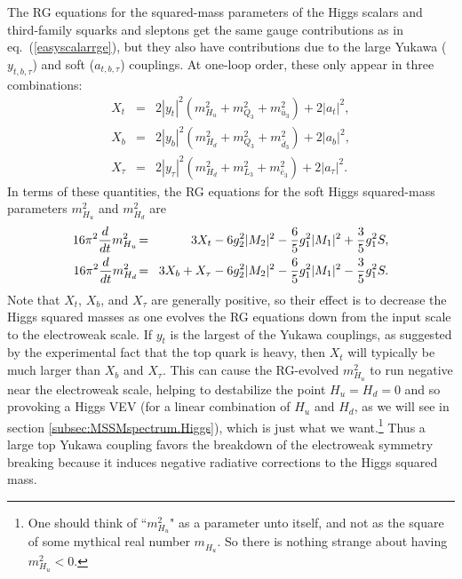 \documentclass[12pt]{article}
\def\beq{\begin{eqnarray}}
\def\eeq{\end{eqnarray}}
\def\sbar{\overline}
\begin{document}
The RG equations for the squared-mass parameters of the Higgs scalars and
third-family squarks and sleptons get the same gauge contributions as in
eq.~(\ref{easyscalarrge}), but they also have contributions due to the
large Yukawa ($y_{t,b,\tau}$) and soft ($a_{t,b,\tau}$) couplings. At
one-loop order, these only appear in three combinations: 
\beq
X_t \!&=&\!  2 |y_t|^2 (m_{H_u}^2 + m_{Q_3}^2 + m_{\sbar u_3}^2) +2 |a_t|^2,
\\
X_b \!&=& \! 2 |y_b|^2 (m_{H_d}^2 + m_{Q_3}^2 + m_{\sbar d_3}^2) +2 |a_b|^2,
\\
X_\tau\! &=&\!  2 |y_\tau|^2 (m_{H_d}^2 + m_{L_3}^2 + m_{\sbar e_3}^2)
+ 2 |a_\tau|^2.
\eeq
In terms of these quantities, the RG equations for the soft Higgs
squared-mass parameters $m_{H_u}^2$ and $m_{H_d}^2$ are
\beq
16 \pi^2 {d\over dt} m_{H_u}^2 \!&=&\!
3 X_t - 6 g_2^2 |M_2|^2 - {6\over 5} g_1^2 |M_1|^2 + \frac{3}{5} g^{2}_1 S
,
\label{mhurge}
\\
16\pi^2{d\over dt} m_{H_d}^2 \!&=&\!
3 X_b + X_\tau - 6 g_2^2 |M_2|^2 - {6\over 5} g_1^2 |M_1|^2 - \frac{3}{5} 
g^{2}_1 S
.
\label{mhdrge}
\eeq
Note that $X_t$, $X_b$, and $X_\tau$ are generally positive, so their
effect is to decrease the Higgs squared masses as one evolves the RG equations
down from the input scale to the electroweak scale. If $y_t$ is the
largest of the Yukawa couplings, as suggested by the experimental fact
that the top quark is heavy, then $X_t$ will typically be much larger than
$X_b$ and $X_\tau$. This can cause the RG-evolved $m_{H_u}^2$ to run
negative near the electroweak scale, helping to destabilize the point $H_u
= H_d = 0$ and so provoking a Higgs VEV (for a linear combination of $H_u$
and $H_d$, as we will see in section \ref{subsec:MSSMspectrum.Higgs}),
which is just what we want.\footnote{One should think of ``$m_{H_u}^2$" as
a parameter unto itself, and not as the square of some mythical real
number $m^{\phantom{2}}_{H_u}$. So there is nothing strange about having
$m_{H_u}^2 < 0$.
} Thus a large top Yukawa coupling favors
the breakdown of the electroweak symmetry breaking because it induces
negative radiative corrections to the Higgs squared mass. 
\end{document}
